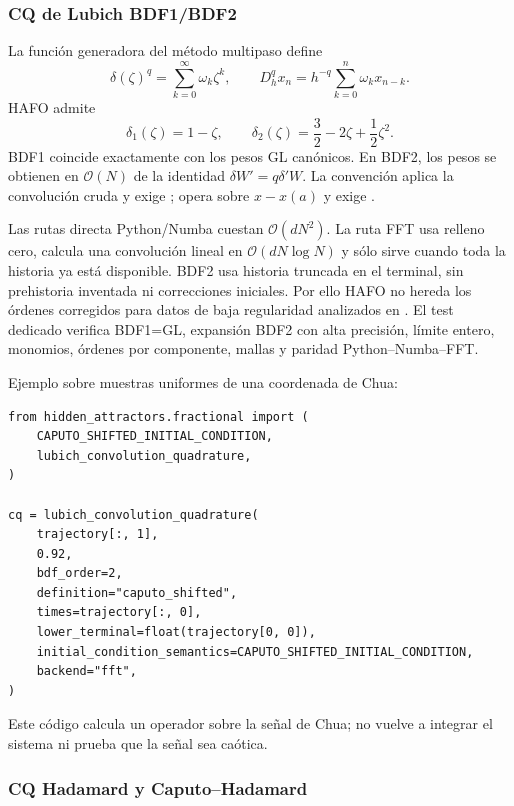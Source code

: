 \subsubsection{CQ de Lubich BDF1/BDF2}

La función generadora del método multipaso define
\begin{equation}
 \delta(\zeta)^q=\sum_{k=0}^{\infty}\omega_k\zeta^k,
 \qquad
 D_h^q x_n=h^{-q}\sum_{k=0}^{n}\omega_kx_{n-k}.
 \label{eq:lubich-cq}
\end{equation}
HAFO admite
\[
 \delta_1(\zeta)=1-\zeta,
 \qquad
 \delta_2(\zeta)=\frac32-2\zeta+\frac12\zeta^2.
\]
BDF1 coincide exactamente con los pesos GL canónicos. En BDF2, los pesos se
obtienen en \(\mathcal O(N)\) de la identidad
\(\delta W'=q\delta'W\). La convención
 aplica la convolución cruda y exige
;  opera sobre
\(x-x(a)\) y exige .

Las rutas directa Python/Numba cuestan \(\mathcal O(dN^2)\). La ruta FFT usa
relleno cero, calcula una convolución lineal en \(\mathcal O(dN\log N)\) y sólo sirve cuando toda
la historia ya está disponible. BDF2 usa historia truncada en el terminal, sin
prehistoria inventada ni correcciones iniciales. Por ello HAFO no hereda los
órdenes corregidos para datos de baja regularidad analizados en
\cite{JinLiZhou2017}. El test dedicado verifica BDF1=GL, expansión BDF2 con alta
precisión, límite entero, monomios, órdenes por componente, mallas y paridad
Python--Numba--FFT.

Ejemplo sobre muestras uniformes de una coordenada de Chua:
\begin{verbatim}
from hidden_attractors.fractional import (
    CAPUTO_SHIFTED_INITIAL_CONDITION,
    lubich_convolution_quadrature,
)

cq = lubich_convolution_quadrature(
    trajectory[:, 1],
    0.92,
    bdf_order=2,
    definition="caputo_shifted",
    times=trajectory[:, 0],
    lower_terminal=float(trajectory[0, 0]),
    initial_condition_semantics=CAPUTO_SHIFTED_INITIAL_CONDITION,
    backend="fft",
)
\end{verbatim}
Este código calcula un operador sobre la señal de Chua; no vuelve a integrar el
sistema ni prueba que la señal sea caótica.

\subsubsection{CQ Hadamard y Caputo--Hadamard}

